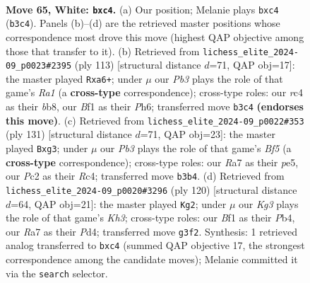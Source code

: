 \documentclass[11pt]{article}
\begin{document}
\clearpage

\begin{figure}[p]\centering
\begin{subfigure}{0.46\textwidth}\centering
\resizebox{\linewidth}{!}{%
\newchessgame
\chessboard[
  setfen={4k2r/R6p/P2n4/8/2r5/1Pp3KP/2P3P1/5B2 w - - 0 65},
  showmover=false,
  pgfstyle=straightmove, color=movearrow, markmove={b3-c4}
]}
\caption{}
\end{subfigure}\hfill
\begin{subfigure}{0.46\textwidth}\centering
\resizebox{\linewidth}{!}{%
\newchessgame
\chessboard[
  setfen={rB6/5p2/R1K1p1kp/3p3p/3P4/6P1/5P2/8 b - - 0 57},
  showmover=false,
  pgfstyle=straightmove, color=movearrow, markmove={a8-a6}
]}
\caption{}
\end{subfigure}
\\[4pt]
\begin{subfigure}{0.46\textwidth}\centering
\resizebox{\linewidth}{!}{%
\newchessgame
\chessboard[
  setfen={8/6p1/4p1kp/4P3/2r2bP1/6RP/8/3R3K b - - 0 66},
  showmover=false,
  pgfstyle=straightmove, color=movearrow, markmove={f4-g3}
]}
\caption{}
\end{subfigure}\hfill
\begin{subfigure}{0.46\textwidth}\centering
\resizebox{\linewidth}{!}{%
\newchessgame
\chessboard[
  setfen={5R2/2p1rr2/8/5p2/1PpPk3/2P3PK/7P/8 w - - 6 61},
  showmover=false,
  pgfstyle=straightmove, color=movearrow, markmove={h3-g2}
]}
\caption{}
\end{subfigure}
\caption{\textbf{Move 65, White: \texttt{bxc4}.} (a) Our position; Melanie plays \texttt{bxc4} (\texttt{b3c4}). Panels (b)--(d) are the retrieved master positions whose correspondence most drove this move (highest QAP objective among those that transfer to it). (b) Retrieved from \texttt{lichess\_elite\_2024-09\_p0023\#2395} (ply 113) [structural distance $d$=71, QAP obj=17]: the master played \texttt{Rxa6+}; under $\mu$ our \emph{Pb3} plays the role of that game's \emph{Ra1} (a \textbf{cross-type} correspondence); cross-type roles: our \emph{r}c4 as their \emph{b}b8, our \emph{B}f1 as their \emph{P}h6; transferred move \texttt{b3c4} \textbf{(endorses this move)}. (c) Retrieved from \texttt{lichess\_elite\_2024-09\_p0022\#353} (ply 131) [structural distance $d$=71, QAP obj=23]: the master played \texttt{Bxg3}; under $\mu$ our \emph{Pb3} plays the role of that game's \emph{Bf5} (a \textbf{cross-type} correspondence); cross-type roles: our \emph{R}a7 as their \emph{p}e5, our \emph{P}c2 as their \emph{R}c4; transferred move \texttt{b3b4}. (d) Retrieved from \texttt{lichess\_elite\_2024-09\_p0020\#3296} (ply 120) [structural distance $d$=64, QAP obj=21]: the master played \texttt{Kg2}; under $\mu$ our \emph{Kg3} plays the role of that game's \emph{Kh3}; cross-type roles: our \emph{B}f1 as their \emph{P}b4, our \emph{R}a7 as their \emph{P}d4; transferred move \texttt{g3f2}. Synthesis: 1 retrieved analog transferred to \texttt{bxc4} (summed QAP objective 17, the strongest correspondence among the candidate moves); Melanie committed it via the \texttt{search} selector.}
\label{fig:thought-m128}
\end{figure}
\end{document}
